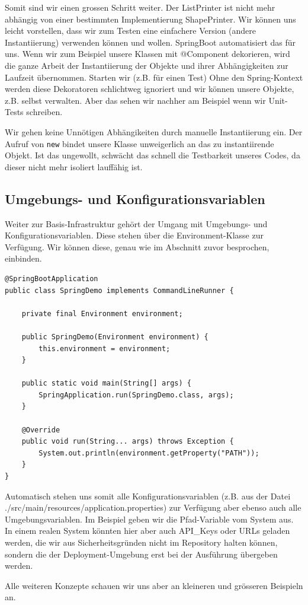 Somit sind wir einen grossen Schritt weiter. Der ListPrinter ist nicht mehr 
abhängig von einer bestimmten Implementierung ShapePrinter. Wir können uns 
leicht vorstellen, dass wir zum Testen eine einfachere Version (andere 
Instantiierung) verwenden können und wollen.
SpringBoot automatisiert das für uns. Wenn wir zum Beispiel unsere Klassen
mit @Component
dekorieren, wird die ganze Arbeit der Instantiierung der Objekte und ihrer
Abhängigkeiten zur Laufzeit übernommen. Starten wir (z.B. für einen Test) 
Ohne den Spring-Kontext werden
diese Dekoratoren schlichtweg ignoriert und wir können unsere Objekte, z.B.
selbst verwalten. Aber das sehen wir nachher am Beispiel wenn wir Unit-Tests
schreiben.

\begin{rulebox}[label=rule:inversionOfControl]{Wir gehen keine
    Unnötigen Abhängikeiten durch manuelle Instantiierung ein.}
Der Aufruf von \texttt{new} bindet unsere Klasse unweigerlich an das
zu instantiirende Objekt. Ist das ungewollt, schwächt das schnell
die Testbarkeit unseres Codes, da dieser nicht mehr isoliert lauffähig
ist.
\end{rulebox}

\subsection{Umgebungs- und Konfigurationsvariablen}
Weiter zur Basis-Infrastruktur gehört der Umgang mit Umgebungs- und 
Konfigurationsvariablen. Diese stehen über die Environment-Klasse zur 
Verfügung. Wir können diese, genau wie im Abschnitt zuvor besprochen,
einbinden.

\begin{listing}[H]
\begin{verbatim}
@SpringBootApplication
public class SpringDemo implements CommandLineRunner {

    private final Environment environment;

    public SpringDemo(Environment environment) {
        this.environment = environment;
    }

    public static void main(String[] args) {
        SpringApplication.run(SpringDemo.class, args);
    }

    @Override
    public void run(String... args) throws Exception {
        System.out.println(environment.getProperty("PATH"));
    }
}
\end{verbatim}
\caption{Properties einlesen}
\label{lst:properties}
\end{listing}

Automatisch stehen uns somit alle Konfigurationsvariablen (z.B. aus der Datei
./src/main/resources/application.properties) zur Verfügung aber ebenso auch 
alle Umgebungsvariablen. Im Beispiel geben wir die Pfad-Variable vom System 
aus. In einem realen System könnten hier aber auch API\_Keys oder URLs 
geladen werden, die wir aus Sicherheitsgründen nicht im Repository halten
können, sondern die der Deployment-Umgebung erst bei der Ausführung übergeben
werden. 

Alle weiteren Konzepte schauen wir uns aber an kleineren und 
grösseren Beispieln an.
